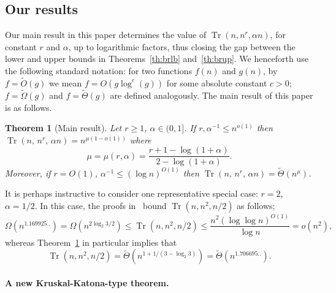 \documentclass[11pt]{article}
\newtheorem{theo}{Theorem}[section]
\newtheorem{theo}{Theorem}[section]
\renewcommand{\a}{\alpha}
\newcommand{\C}{\mu}
\DeclareMathOperator{\trace}{Tr}
\begin{document}

\subsection{Our results}
Our main result in this paper determines the value of $\trace(n,n^r,\a n)$, for constant $r$ and $\a$, up to logarithmic
factors, thus closing the gap between the lower and upper bounds in Theorems~\ref{th:brlb} and~\ref{th:brup}. 
We henceforth use the following standard notation: for two functions $f(n)$ and $g(n)$, by $f=\tilde{O}(g)$ we mean
$f = O(g\log^c(g))$ for some absolute constant $c>0$;
$f=\tilde{\Omega}(g)$ and
$f=\tilde{\Theta}(g)$ are defined analogously. 
The main result of this paper is as follows.
\begin{theo}[Main result]\label{t12}
	Let $r \ge 1$, $\a \in (0,1]$. If $r, \a^{-1} \le n^{o(1)}$ then %
	$\trace(n,\,n^r,\,\a n) = n^{\C(1-o(1))}$
	where
	\begin{equation}\label{eq:C}
	\C=\C(r,\a)=\frac{r+1-\log(1+\a)}{2-\log(1+\a)}.
	\end{equation}
	Moreover, if $r=O(1)$, $\a^{-1} \le (\log n)^{O(1)}$ then $\trace(n,\,n^r,\,\a n) = \tilde{\Theta}(n^{\C})$.
\end{theo}

It is perhaps instructive to consider one representative special 
case: $r=2$, $\a = 1/2$. 
In this case, 
the proofs in~\cite{BR} 
bound $\trace(n,n^2,n/2)$ as follows;
$$
\Omega(n^{1.169925..}) =
\Omega(n^{2 \log_2 {3/2}}) \leq \trace(n,n^2,n/2) 
\le \frac{n^2 (\log \log n)^{O(1)}}{\log n} = o(n^2),
$$
whereas Theorem~\ref{t12} in particular implies that
$$\trace(n,n^2,n/2)=\tilde{\Theta}(n^{1+1/(3-\log_2 3)})
=\tilde{\Theta}(n^{1.706695..}).
$$

\paragraph{A new Kruskal-Katona-type theorem.}
\end{document}
